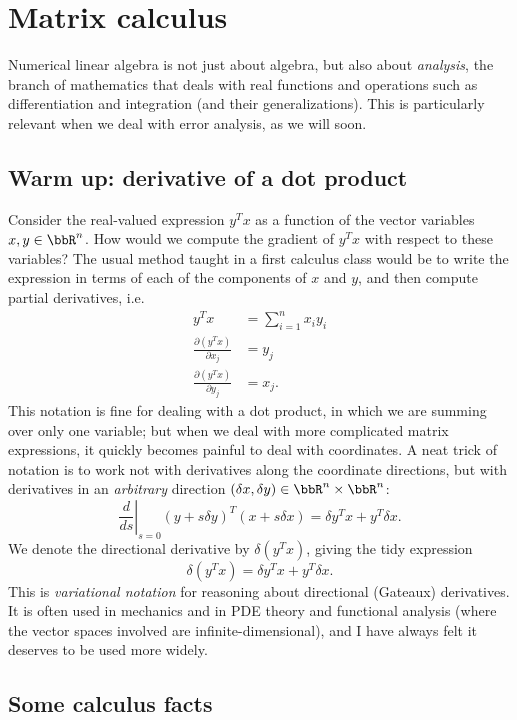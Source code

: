 \section{Matrix calculus}

Numerical linear algebra is not just about algebra, but also about
{\em analysis}, the branch of mathematics that deals with real
functions and operations such as differentiation and integration
(and their generalizations).  This is particularly relevant when
we deal with error analysis, as we will soon.

\subsection{Warm up: derivative of a dot product}

Consider the real-valued expression $y^T x$ as a function of
the vector variables $x, y \in \bbR^n$.  How would we compute
the gradient of $y^T x$ with respect to these variables?
The usual method taught in a first calculus class would be
to write the expression in terms of each of the components of $x$
and $y$, and then compute partial derivatives, i.e.
\begin{align*}
  y^T x &= \sum_{i=1}^n x_i y_i \\
  \frac{\partial (y^T x)}{\partial x_j} &= y_j \\
  \frac{\partial (y^T x)}{\partial y_j} &= x_j.
\end{align*}
This notation is fine for dealing with a dot product, in which
we are summing over only one variable; but when we deal with more
complicated matrix expressions, it quickly becomes painful to deal
with coordinates.  A neat trick of notation is to work not with
derivatives along the coordinate directions, but with derivatives
in an {\em arbitrary} direction
$(\delta x, \delta y) \in \bbR^n \times \bbR^n$:
\[
  \left. \frac{d}{ds} \right|_{s=0} (y+s \delta y)^T (x + s \delta x)
  = \delta y^T x + y^T \delta x.
\]
We denote the directional derivative by $\delta(y^T x)$, giving the
tidy expression
\[
  \delta(y^T x) = \delta y^T x + y^T \delta x.
\]
This is {\em variational notation} for reasoning about directional
(Gateaux) derivatives.  It is often used in
mechanics and in PDE theory and functional analysis
(where the vector spaces involved are infinite-dimensional),
and I have always felt it deserves to be used more widely.

\subsection{Some calculus facts}

